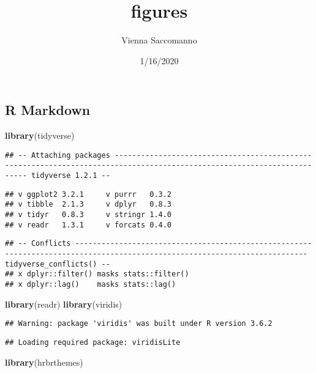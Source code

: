 \documentclass[]{article}
\title{figures}
\author{Vienna Saccomanno}
\date{1/16/2020}
\newenvironment{Shaded}{\begin{snugshade}}{\end{snugshade}}
\newcommand{\KeywordTok}[1]{\textcolor[rgb]{0.13,0.29,0.53}{\textbf{#1}}}
\newcommand{\NormalTok}[1]{#1}
\begin{document}
\maketitle

\hypertarget{r-markdown}{%
\subsection{R Markdown}\label{r-markdown}}

\begin{Shaded}
\begin{Highlighting}[]
\KeywordTok{library}\NormalTok{(tidyverse)}
\end{Highlighting}
\end{Shaded}

\begin{verbatim}
## -- Attaching packages ------------------------------------------------------------------------------------------------------------------------ tidyverse 1.2.1 --
\end{verbatim}

\begin{verbatim}
## v ggplot2 3.2.1     v purrr   0.3.2
## v tibble  2.1.3     v dplyr   0.8.3
## v tidyr   0.8.3     v stringr 1.4.0
## v readr   1.3.1     v forcats 0.4.0
\end{verbatim}

\begin{verbatim}
## -- Conflicts --------------------------------------------------------------------------------------------------------------------------- tidyverse_conflicts() --
## x dplyr::filter() masks stats::filter()
## x dplyr::lag()    masks stats::lag()
\end{verbatim}

\begin{Shaded}
\begin{Highlighting}[]
\KeywordTok{library}\NormalTok{(readr)}
\KeywordTok{library}\NormalTok{(viridis)}
\end{Highlighting}
\end{Shaded}

\begin{verbatim}
## Warning: package 'viridis' was built under R version 3.6.2
\end{verbatim}

\begin{verbatim}
## Loading required package: viridisLite
\end{verbatim}

\begin{Shaded}
\begin{Highlighting}[]
\KeywordTok{library}\NormalTok{(hrbrthemes)}
\end{Highlighting}
\end{Shaded}
\end{document}
